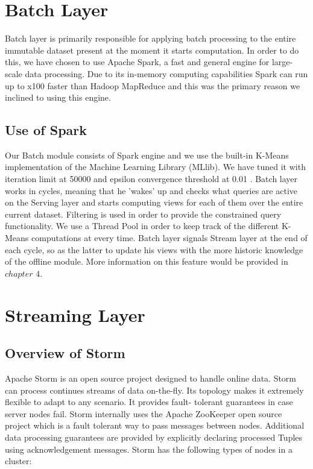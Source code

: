 \documentclass{lmproj}
\begin{document}
\section{Batch Layer}
\label{systemdescr}

Batch layer is primarily responsible for applying batch processing to the entire immutable dataset present at the moment it starts computation. In order to do this, we have chosen to use Apache Spark, a fast and general engine for large-scale data processing. Due to its in-memory computing capabilities Spark can run up to x100 faster than Hadoop MapReduce and this was the primary reason we inclined to using this engine.

\subsection{Use of Spark}

Our Batch module consists of Spark engine and we use the built-in K-Means implementation of the Machine Learning Library (MLlib). We have tuned it with iteration limit at 50000 and epsilon convergence threshold at 0.01 . Batch layer works in cycles, meaning that he 'wakes' up and checks what queries are active on the Serving layer and starts computing views for each of them over the entire current dataset. Filtering is used in order to provide the constrained query functionality. We use a Thread Pool in order to keep track of the different K-Means computations at every time. Batch layer signals Stream layer at the end of each cycle, so as the latter to update his views with the more historic knowledge of the offline module. More information on this feature would be provided in $chapter$ $4$. 



\section{Streaming Layer}
\label{systemdescr}

\subsection{Overview of Storm}

Apache Storm is an open source project designed to handle online data. Storm can process continues streams of data on-the-fly.  Its topology makes it extremely flexible to adapt to any scenario. It provides fault- tolerant guarantees in case server nodes fail. Storm internally uses the Apache ZooKeeper open source project which is a fault tolerant way to pass messages between nodes. Additional data processing guarantees are provided by explicitly declaring processed Tuples using acknowledgement messages. Storm has the following types of nodes in a cluster:
\end{document}
